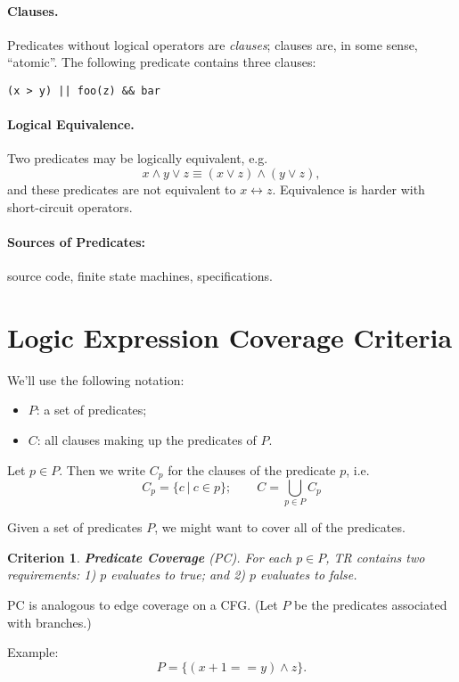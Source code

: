 \documentclass[11pt]{article}
\newtheorem{crit}{Criterion}
\begin{document}
\paragraph{Clauses.} Predicates without logical operators are \emph{clauses};
clauses are, in some sense, ``atomic''. The following predicate contains three clauses:
\begin{center}
{\tt (x > y) || foo(z) \&\& bar}
\end{center}

\paragraph{Logical Equivalence.} Two predicates may be logically equivalent, e.g. 
\[ x \wedge y \vee z \equiv (x \vee z) \wedge (y \vee z), \]
and these predicates are not equivalent to $x \leftrightarrow z$. Equivalence is harder with
short-circuit operators.

\paragraph{Sources of Predicates:} source code, finite state machines, specifications.

\section*{Logic Expression Coverage Criteria}
We'll use the following notation:
\begin{itemize}
\item $P$: a set of predicates;
\item $C$: all clauses making up the predicates of $P$.
\end{itemize}

Let $p \in P$. Then we write $C_p$ for the clauses of the predicate $p$, 
i.e.
\[ C_p = \{ c\ |\ c \in p \}; \qquad C = \bigcup_{p \in P} C_p \]

Given a set of predicates $P$, we might want to cover all of the predicates.
\begin{crit}
{\bf Predicate Coverage} (PC). For each $p \in P$, TR contains two requirements:
1) $p$ evaluates to true; and 2) $p$ evaluates to false.
\end{crit}
PC is analogous to edge coverage on a CFG. (Let $P$ be the 
predicates associated with branches.)

{\sf Example:} ~\\[1em]
\[ P = \{ ( x + 1 == y) \wedge z \}. \]
\end{document}
